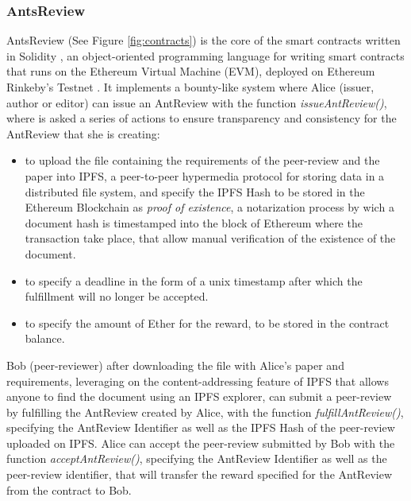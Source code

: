 \documentclass[runningheads]{llncs}
\begin{document}
\subsubsection{AntsReview}
AntsReview (See Figure \ref{fig:contracts}) is the core of the smart contracts written in Solidity \cite{Solidity}, an object-oriented programming language for writing smart contracts that runs on the Ethereum Virtual Machine (EVM), deployed on Ethereum Rinkeby's Testnet \cite{Rinkeby}.
\newline It implements a bounty-like system where Alice (issuer, author or editor) can issue an AntReview with the function \emph{issueAntReview()}, where is asked a series of actions to ensure transparency and consistency for the AntReview that she is creating:
\begin{itemize}
  \item to upload the file containing the requirements of the peer-review and the paper into IPFS\cite{IPFS}, a peer-to-peer hypermedia protocol for storing data in a distributed file system, and specify the IPFS Hash to be stored in the Ethereum Blockchain as \emph{proof of existence}, a notarization process by wich a document hash is timestamped into the block of Ethereum where the transaction take place, that allow manual verification of the existence of the document.
  \item to specify a deadline in the form of a unix timestamp after which the fulfillment will no longer be accepted.
  \item to specify the amount of Ether for the reward, to be stored in the contract balance.
\end{itemize}

\newline Bob (peer-reviewer) after downloading the file with Alice's paper and requirements, leveraging on the content-addressing feature of IPFS that allows anyone to find the document using an IPFS explorer, can submit a peer-review by fulfilling the AntReview created by Alice, with the function \emph{fulfillAntReview()}, specifying the AntReview Identifier as well as the IPFS Hash of the peer-review uploaded on IPFS.
\newline Alice can accept the peer-review submitted by Bob with the function \emph{acceptAntReview()}, specifying the AntReview Identifier as well as the peer-review identifier, that will transfer the reward specified for the AntReview from the contract to Bob.
\end{document}
